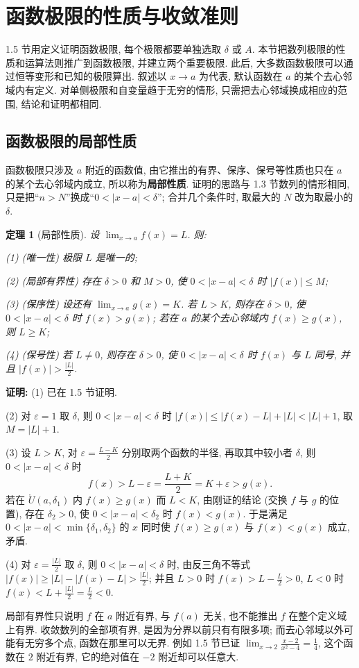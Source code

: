\documentclass[UTF8,openany]{ctexbook}
\theoremstyle{chinesetextbook}
\newtheorem{theorem}{定理}[section]
\newenvironment{cnproof}{\par\indent\textbf{证明:} \ignorespaces}{\par}
\begin{document}
\section{函数极限的性质与收敛准则}
1.5 节用定义证明函数极限, 每个极限都要单独选取 $\delta$ 或 $A$. 本节把数列极限的性质和运算法则推广到函数极限, 并建立两个重要极限. 此后, 大多数函数极限可以通过恒等变形和已知的极限算出. 叙述以 $x\to a$ 为代表, 默认函数在 $a$ 的某个去心邻域内有定义. 对单侧极限和自变量趋于无穷的情形, 只需把去心邻域换成相应的范围, 结论和证明都相同.
\subsection{函数极限的局部性质}
函数极限只涉及 $a$ 附近的函数值, 由它推出的有界、保序、保号等性质也只在 $a$ 的某个去心邻域内成立, 所以称为\textbf{局部性质}. 证明的思路与 1.3 节数列的情形相同, 只是把“$n>N$”换成“$0<|x-a|<\delta$”; 合并几个条件时, 取最大的 $N$ 改为取最小的 $\delta$.
\begin{theorem}[局部性质]
设 $\displaystyle\lim_{x\to a}f(x)=L$. 则:

\textup{(1)} (唯一性) 极限 $L$ 是唯一的;

\textup{(2)} (局部有界性) 存在 $\delta>0$ 和 $M>0$, 使 $0<|x-a|<\delta$ 时 $|f(x)|\le M$;

\textup{(3)} (保序性) 设还有 $\displaystyle\lim_{x\to a}g(x)=K$. 若 $L>K$, 则存在 $\delta>0$, 使 $0<|x-a|<\delta$ 时 $f(x)>g(x)$; 若在 $a$ 的某个去心邻域内 $f(x)\ge g(x)$, 则 $L\ge K$;

\textup{(4)} (保号性) 若 $L\ne0$, 则存在 $\delta>0$, 使 $0<|x-a|<\delta$ 时 $f(x)$ 与 $L$ 同号, 并且 $\displaystyle|f(x)|>\frac{|L|}2$.
\end{theorem}
\begin{cnproof}
(1) 已在 1.5 节证明.

(2) 对 $\varepsilon=1$ 取 $\delta$, 则 $0<|x-a|<\delta$ 时 $|f(x)|\le|f(x)-L|+|L|<|L|+1$, 取 $M=|L|+1$.

(3) 设 $L>K$, 对 $\displaystyle\varepsilon=\frac{L-K}2$ 分别取两个函数的半径, 再取其中较小者 $\delta$, 则 $0<|x-a|<\delta$ 时
\[
f(x)>L-\varepsilon=\frac{L+K}2=K+\varepsilon>g(x).
\]
若在 $\mathring U(a,\delta_1)$ 内 $f(x)\ge g(x)$ 而 $L<K$, 由刚证的结论 (交换 $f$ 与 $g$ 的位置), 存在 $\delta_2>0$, 使 $0<|x-a|<\delta_2$ 时 $f(x)<g(x)$. 于是满足 $0<|x-a|<\min\{\delta_1,\delta_2\}$ 的 $x$ 同时使 $f(x)\ge g(x)$ 与 $f(x)<g(x)$ 成立, 矛盾.

(4) 对 $\displaystyle\varepsilon=\frac{|L|}2$ 取 $\delta$, 则 $0<|x-a|<\delta$ 时, 由反三角不等式 $\displaystyle|f(x)|\ge|L|-|f(x)-L|>\frac{|L|}2$; 并且 $L>0$ 时 $\displaystyle f(x)>L-\frac L2>0$, $L<0$ 时 $\displaystyle f(x)<L+\frac{|L|}2=\frac L2<0$.
\end{cnproof}
局部有界性只说明 $f$ 在 $a$ 附近有界, 与 $f(a)$ 无关, 也不能推出 $f$ 在整个定义域上有界. 收敛数列的全部项有界, 是因为分界以前只有有限多项; 而去心邻域以外可能有无穷多个点, 函数在那里可以无界. 例如 1.5 节已证 $\displaystyle\lim_{x\to2}\frac{x-2}{x^2-4}=\frac14$, 这个函数在 $2$ 附近有界, 它的绝对值在 $-2$ 附近却可以任意大.
\end{document}
